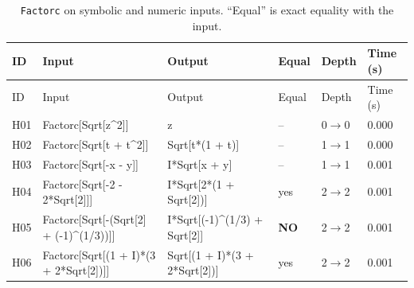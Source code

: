 \begin{longtable}{@{}p{}>{\ttfamily\footnotesize\raggedright\arraybackslash}p{}>{\ttfamily\footnotesize\raggedright\arraybackslash}p{}p{}p{}p{}@{}}
\caption{\texttt{Factorc} on symbolic and numeric inputs. ``Equal'' is exact equality with the input.}\label{tab:helpH}\\
\toprule ID & Input & Output & Equal & Depth & Time (s)\\\midrule\endfirsthead
\toprule ID & Input & Output & Equal & Depth & Time (s)\\\midrule\endhead
\bottomrule\endfoot
H01 & Factorc[\allowbreak{}Sqrt[\allowbreak{}z\textasciicircum{}\allowbreak{}2]\allowbreak{}]\allowbreak{} & z & -- & 0$\to$0 & 0.000\\
H02 & Factorc[\allowbreak{}Sqrt[\allowbreak{}t +\allowbreak{} t\textasciicircum{}\allowbreak{}2]\allowbreak{}]\allowbreak{} & Sqrt[\allowbreak{}t*\allowbreak{}(\allowbreak{}1 +\allowbreak{} t)\allowbreak{}]\allowbreak{} & -- & 1$\to$1 & 0.000\\
H03 & Factorc[\allowbreak{}Sqrt[\allowbreak{}-x -\allowbreak{} y]\allowbreak{}]\allowbreak{} & I*\allowbreak{}Sqrt[\allowbreak{}x +\allowbreak{} y]\allowbreak{} & -- & 1$\to$1 & 0.001\\
H04 & Factorc[\allowbreak{}Sqrt[\allowbreak{}-2 -\allowbreak{} 2*\allowbreak{}Sqrt[\allowbreak{}2]\allowbreak{}]\allowbreak{}]\allowbreak{} & I*\allowbreak{}Sqrt[\allowbreak{}2*\allowbreak{}(\allowbreak{}1 +\allowbreak{} Sqrt[\allowbreak{}2]\allowbreak{})\allowbreak{}]\allowbreak{} & yes & 2$\to$2 & 0.001\\
H05 & Factorc[\allowbreak{}Sqrt[\allowbreak{}-(\allowbreak{}Sqrt[\allowbreak{}2]\allowbreak{} +\allowbreak{} (\allowbreak{}-1)\allowbreak{}\textasciicircum{}\allowbreak{}(\allowbreak{}1/\allowbreak{}3)\allowbreak{})\allowbreak{}]\allowbreak{}]\allowbreak{} & I*\allowbreak{}Sqrt[\allowbreak{}(\allowbreak{}-1)\allowbreak{}\textasciicircum{}\allowbreak{}(\allowbreak{}1/\allowbreak{}3)\allowbreak{} +\allowbreak{} Sqrt[\allowbreak{}2]\allowbreak{}]\allowbreak{} & \textbf{NO} & 2$\to$2 & 0.001\\
H06 & Factorc[\allowbreak{}Sqrt[\allowbreak{}(\allowbreak{}1 +\allowbreak{} I)\allowbreak{}*\allowbreak{}(\allowbreak{}3 +\allowbreak{} 2*\allowbreak{}Sqrt[\allowbreak{}2]\allowbreak{})\allowbreak{}]\allowbreak{}]\allowbreak{} & Sqrt[\allowbreak{}(\allowbreak{}1 +\allowbreak{} I)\allowbreak{}*\allowbreak{}(\allowbreak{}3 +\allowbreak{} 2*\allowbreak{}Sqrt[\allowbreak{}2]\allowbreak{})\allowbreak{}]\allowbreak{} & yes & 2$\to$2 & 0.001\\

\end{longtable}
